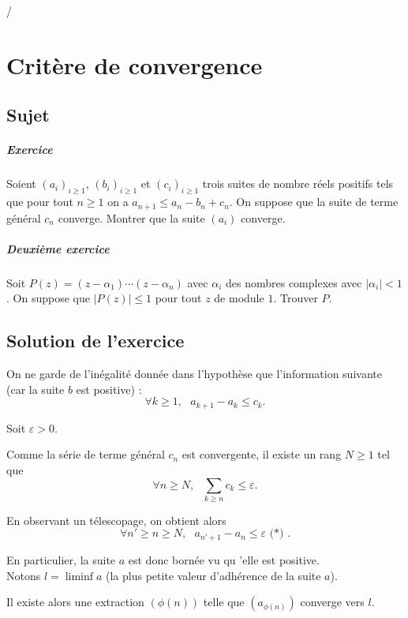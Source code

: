 /\chapter{Critère de convergence}

\section{Sujet}

\paragraph{Exercice}
Soient $(a_i)_{i\geqslant 1}$, $(b_i)_{i\geqslant 1}$ et $(c_i)_{i\geqslant 1}$ trois suites de nombre réels positifs tels que pour tout $n \geqslant 1$ on a $a_{n+1} \leqslant a_n - b_n + c_n$. On suppose que la suite de terme général $c_n$ converge. Montrer que la suite $(a_i)$ converge.

\paragraph{Deuxième exercice}
Soit $P(z) = (z-\alpha_1)\cdots(z-\alpha_n)$ avec $\alpha_i$ des nombres complexes avec $|\alpha_i| < 1$.
On suppose que $|P(z)| \leqslant 1$ pour tout $z$ de module $1$.
Trouver $P$.


\section{Solution de l'exercice}

On ne garde de l'inégalité donnée dans l'hypothèse que l'information suivante (car la suite $b$ est positive) : 
$$\forall k\geq 1,\mbox{ } a_{k+1}-a_{k}\leq c_{k}.$$

Soit $\varepsilon>0.$

Comme la série de terme général $c_{n}$ est convergente, il existe un rang $N\geq 1$ tel que $$\forall n\geq N,\mbox{ } \sum_{k\geq n}c_{k}\leq \varepsilon.$$

En observant un télescopage, on obtient alors
$$\forall n'\geq n\geq N, \mbox{ } a_{n'+1}-a_{n}\leq \varepsilon \mbox{ (*) }.$$

En particulier, la suite $a$ est donc bornée vu qu 'elle est positive.\\

Notons $l=\liminf a$ (la plus petite valeur d'adhérence de la suite $a$).

Il existe alors une extraction $(\phi(n))$ telle que $(a_{\phi(n)})$ converge vers $l.$

